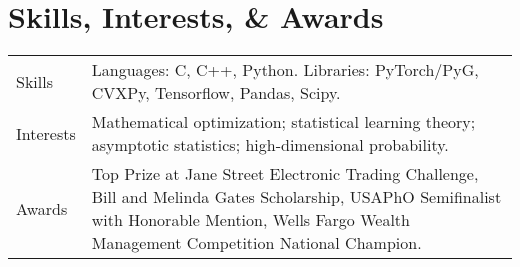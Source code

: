\documentclass[a4paper,10pt]{article}
\begin{document}

\section{Skills, Interests, \& Awards}
\begin{tabularx}{\linewidth}{@{}l X@{}}
Skills & \normalsize{ Languages: C, C++, Python. Libraries: PyTorch/PyG, CVXPy, Tensorflow, Pandas, Scipy.}\\[2pt]
Interests & \normalsize{Mathematical optimization; statistical learning theory; asymptotic statistics; high-dimensional probability.}\\[2pt]
Awards & \normalsize{Top Prize at Jane Street Electronic Trading Challenge, Bill and Melinda Gates Scholarship, USAPhO Semifinalist with Honorable Mention, Wells Fargo Wealth Management Competition National Champion.}
\end{tabularx}

\end{document}
